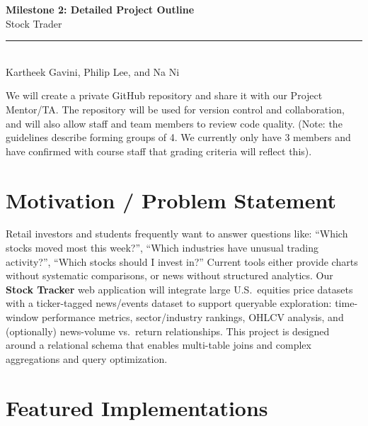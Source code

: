 \documentclass[11pt]{article}
\begin{document}
\begin{center}
    \vspace*{0.5em}
    {\LARGE\bfseries\color{accent} Milestone 2: Detailed Project Outline}\\[0.5em]
    {\Large Stock Trader}\\[0.8em]
    \textcolor{accent}{\rule{0.6\textwidth}{1pt}}\\[1em]
    {\large Kartheek Gavini, Philip Lee, and Na Ni}
\end{center}

\vspace{0.5em}

We will create a private GitHub repository and share it with our Project Mentor/TA. The repository will be used for version control and collaboration, and will also allow staff and team members to review code quality. (Note: the guidelines describe forming groups of 4. We currently only have 3 members and have confirmed with course staff that grading criteria will reflect this).

\section{Motivation / Problem Statement}

Retail investors and students frequently want to answer questions like: ``Which stocks moved most this week?'', ``Which industries have unusual trading activity?'', ``Which stocks should I invest in?'' Current tools either provide charts without systematic comparisons, or news without structured analytics. Our \textbf{Stock Tracker} web application will integrate large U.S.\ equities price datasets with a ticker-tagged news/events dataset to support queryable exploration: time-window performance metrics, sector/industry rankings, OHLCV analysis, and (optionally) news-volume vs.\ return relationships. This project is designed around a relational schema that enables multi-table joins and complex aggregations and query optimization.

\section{Featured Implementations}
\end{document}
